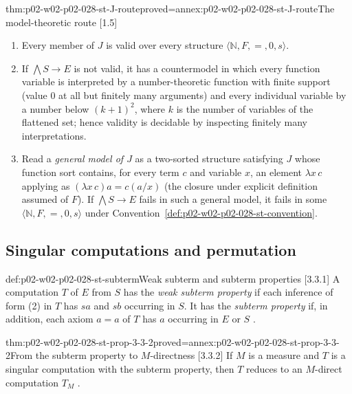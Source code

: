 \begin{hbtheorem}{thm:p02-w02-p02-028-st-J-route}{proved=annex:p02-w02-p02-028-st-J-route}{The model-theoretic route [1.5]}
\begin{enumerate}
  \item Every member of \(J\) is valid over every structure
        \(\langle\mathbb N,F,=,0,s\rangle\).
  \item If \(\bigwedge S\to E\) is not valid, it has a countermodel in which
        every function variable is interpreted by a number-theoretic function
        with finite support (value \(0\) at all but finitely many arguments)
        and every individual variable by a number below
        \((k+1)^2\), where \(k\) is the number of variables of the flattened
        set; hence validity is decidable by inspecting finitely many
        interpretations.
  \item Read a \emph{general model of \(J\)} as a two-sorted structure
        satisfying \(J\) whose function sort contains, for every term \(c\)
        and variable \(x\), an element \(\lambda x\,c\) applying as
        \((\lambda x\,c)a=c(a/x)\) (the closure under explicit definition
        assumed of \(F\)).  If \(\bigwedge S\to E\) fails in such a general
        model, it fails in some \(\langle\mathbb N,F,=,0,s\rangle\) under
        Convention~\ref{def:p02-w02-p02-028-st-convention}.
\end{enumerate}
\end{hbtheorem}

\subsection{Singular computations and permutation}
\label{sec:p02-w02-p02-028-st-singular}

\begin{hbdefinition}{def:p02-w02-p02-028-st-subterm}{Weak subterm and subterm properties [3.3.1]}
A computation \(T\) of \(E\) from \(S\) has the \emph{weak subterm property}
if each inference of form (2) in \(T\) has \(sa\) and \(sb\) occurring in
\(S\).  It has the \emph{subterm property} if, in addition, each axiom
\(a=a\) of \(T\) has \(a\) occurring in \(E\) or \(S\)
\cite[\S3.3.1, p.~907]{Statman1977}.
\end{hbdefinition}

\begin{hbtheorem}{thm:p02-w02-p02-028-st-prop-3-3-2}{proved=annex:p02-w02-p02-028-st-prop-3-3-2}{From the subterm property to \(M\)-directness [3.3.2]}
If \(M\) is a measure and \(T\) is a singular computation with the subterm
property, then \(T\) reduces to an \(M\)-direct computation \(T_M\)
\cite[\S3.3.2, p.~907]{Statman1977}.
\end{hbtheorem}

